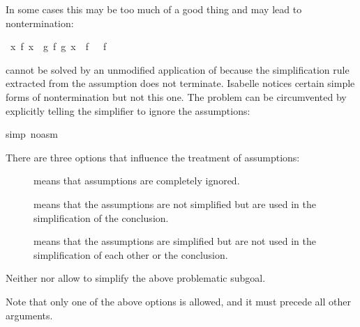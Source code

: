 \begin{isabelle}
\begin{isamarkuptext}
In some cases this may be too much of a good thing and may lead to
nontermination:%
\end{isamarkuptext}%
\ {\isachardoublequote}{\isasymforall}x{\isachardot}\ f\ x\ {\isacharequal}\ g\ {\isacharparenleft}f\ {\isacharparenleft}g\ x{\isacharparenright}{\isacharparenright}\ {\isasymLongrightarrow}\ f\ {\isacharbrackleft}{\isacharbrackright}\ {\isacharequal}\ f\ {\isacharbrackleft}{\isacharbrackright}\ {\isacharat}\ {\isacharbrackleft}{\isacharbrackright}{\isachardoublequote}%
\begin{isamarkuptxt}%
\noindent
cannot be solved by an unmodified application of  because the
simplification rule  extracted from the assumption
does not terminate. Isabelle notices certain simple forms of
nontermination but not this one. The problem can be circumvented by
explicitly telling the simplifier to ignore the assumptions:%
\end{isamarkuptxt}%
simp\ {\isacharparenleft}no{\isacharunderscore}asm{\isacharparenright}{\isacharparenright}%
\begin{isamarkuptext}%
\noindent
There are three options that influence the treatment of assumptions:
\begin{description}
\item[]
 means that assumptions are completely ignored.
\item[]
 means that the assumptions are not simplified but
  are used in the simplification of the conclusion.
\item[]
 means that the assumptions are simplified but are not
  used in the simplification of each other or the conclusion.
\end{description}
Neither  nor  allow to simplify the above
problematic subgoal.

Note that only one of the above options is allowed, and it must precede all
other arguments.%
\end{isamarkuptext}%
\end{isabelle}%
